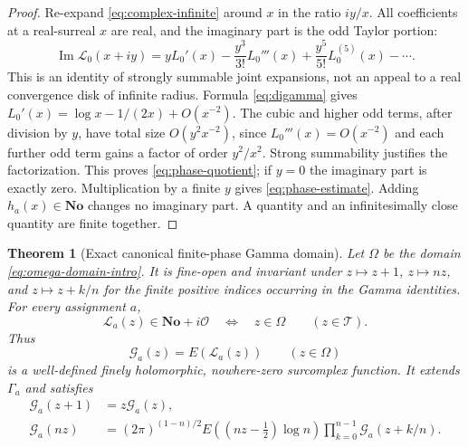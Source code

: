 \documentclass[11pt,letterpaper]{article}
\numberwithin{equation}{section}
\newtheorem{theorem}{Theorem}[section]
\theoremstyle{plain}
\theoremstyle{definition}
\theoremstyle{remark}
\newcommand{\No}{\mathbf{No}}
\newcommand{\Ocal}{\mathcal O}
\newcommand{\Imn}{\operatorname{Im}}
\newcommand{\tube}{\mathcal T}
\newcommand{\Lt}{\mathcal L}
\newcommand{\Gt}{\mathcal G}
\begin{document}
\begin{proof}
Re-expand \eqref{eq:complex-infinite} around $x$ in the ratio $iy/x$.
All coefficients at a real-surreal $x$ are real, and the imaginary part
is the odd Taylor portion:
\[
 \Imn\Lt_0(x+iy)
 =yL_0'(x)-\frac{y^3}{3!}L_0'''(x)
 +\frac{y^5}{5!}L_0^{(5)}(x)-\cdots.
\]
This is an identity of strongly summable joint expansions, not an appeal to
a real convergence disk of infinite radius. Formula \eqref{eq:digamma}
gives $L_0'(x)=\log x-1/(2x)+O(x^{-2})$.
The cubic and higher odd terms, after division by $y$, have total size
$O(y^2x^{-2})$, since $L_0'''(x)=O(x^{-2})$ and each further odd
term gains a factor of order $y^2/x^2$. Strong summability justifies the
factorization. This proves \eqref{eq:phase-quotient}; if $y=0$ the
imaginary part is exactly zero. Multiplication by a finite $y$ gives
\eqref{eq:phase-estimate}. Adding $h_a(x)\in\No$ changes no imaginary
part. A quantity and an infinitesimally close quantity are finite together.
\end{proof}

\begin{theorem}[Exact canonical finite-phase Gamma domain]
\label{thm:phase-domain}
Let $\Omega$ be the domain \eqref{eq:omega-domain-intro}. It is fine-open
and invariant under $z\mapsto z+1$, $z\mapsto nz$, and
$z\mapsto z+k/n$ for the finite positive indices occurring in the Gamma
identities. For every assignment $a$,
\[
 \Lt_a(z)\in\No+i\Ocal\quad\Longleftrightarrow\quad z\in\Omega
 \qquad(z\in\tube).
\]
Thus
\begin{equation}\label{eq:complex-gamma}
 \Gt_a(z)=E(\Lt_a(z))\qquad(z\in\Omega)
\end{equation}
is a well-defined finely holomorphic, nowhere-zero surcomplex function.
It extends $\Gamma_a$ and satisfies
\begin{align}
 \Gt_a(z+1)&=z\Gt_a(z),\label{eq:actual-complex-recurrence}\\
 \Gt_a(nz)&=(2\pi)^{(1-n)/2}E((nz-\tfrac12)\log n)
 \prod_{k=0}^{n-1}\Gt_a(z+k/n).\label{eq:actual-complex-gauss}
\end{align}
\end{theorem}
\end{document}
